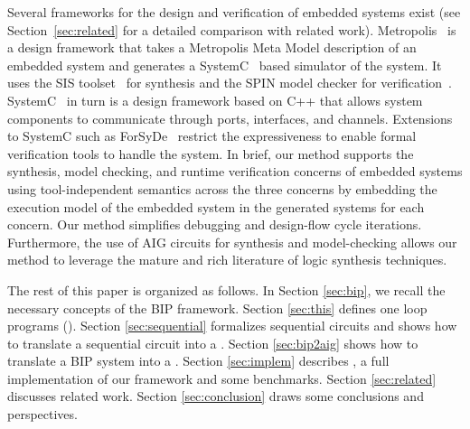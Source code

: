 
Several frameworks for the design and verification of embedded systems exist 
(see Section~\ref{sec:related} for a detailed comparison with related work).
%
Metropolis~\cite{metropolis1,metropolis2} is a design framework that
takes a Metropolis Meta Model description of an embedded system 
and generates a SystemC~\cite{systemc} based simulator of the system.
It uses the SIS toolset~\cite{brayton92sis} for synthesis and the SPIN model checker for verification~\cite{HolzSpin97}. 
SystemC~\cite{systemc} in turn is a design framework based on C++ that allows
system components to communicate through ports, interfaces, and channels.
Extensions to SystemC such as ForSyDe~\cite{SanderJ04} restrict the 
expressiveness to enable formal verification tools to handle the system. 
In brief, our method supports the synthesis, model checking, and runtime verification 
concerns of embedded systems using tool-independent semantics across the three concerns
by embedding the execution model of the embedded system in the generated systems 
for each concern. 
Our method simplifies debugging and design-flow cycle iterations. Furthermore, 
the use of AIG circuits for synthesis and model-checking allows our method to leverage
the mature and rich literature of logic synthesis techniques. 


The rest of this paper is organized as follows. In Section \ref{sec:bip}, we recall the necessary concepts of the BIP framework. Section \ref{sec:this} defines one loop programs (\caig). Section \ref{sec:sequential} formalizes sequential circuits and shows how to translate a sequential circuit into a \caig. Section \ref{sec:bip2aig} shows how to translate a BIP system into a \caig. Section \ref{sec:implem}
describes \biptool{}, a full implementation of our framework and some benchmarks. Section \ref{sec:related} discusses related work. Section \ref{sec:conclusion} draws some conclusions and perspectives.
